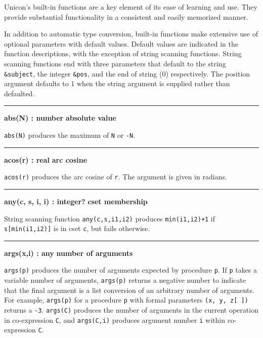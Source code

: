 Unicon's built-in functions
are a key element of its ease of learning and use. They provide
substantial functionality in a consistent and easily memorized manner.

In addition to automatic type conversion, built-in functions make
extensive use of optional parameters with default values. Default
values are indicated in the function descriptions, with the exception
of string scanning functions.
String scanning
functions end with three parameters that
default to the string \texttt{\&subject}, the integer \texttt{\&pos},
and the end of string (0) respectively. The position argument defaults
to 1 when the string argument is supplied rather than defaulted.

\bigskip
\hrule\vspace{0.1cm}
\noindent
{\bf abs(N) : number} \hfill {\bf absolute value}

\noindent
{}\texttt{abs(N)} produces the maximum of
\texttt{N} or \texttt{{}-N}.

\bigskip
\hrule\vspace{0.1cm}
\noindent
{\bf acos(r) : real} \hfill {\bf arc cosine}

\noindent
{}\texttt{acos(r)} produces the arc cosine of
\texttt{r}. The argument is given in radians.

\bigskip
\hrule\vspace{0.1cm}
\noindent
{\bf any(c, s, i, i) : integer? } \hfill {\bf cset membership}

\noindent
{}String scanning function
\texttt{any(c,s,i1,i2)} produces \texttt{min(i1,i2)+1} if \texttt{s[min(i1,i2)]}
is in cset \texttt{c}, but fails otherwise.

\bigskip
\hrule\vspace{0.1cm}
\noindent
{\bf args(x,i) : any } \hfill {\bf number of arguments}

\noindent
{}\texttt{args(p)} produces the number of arguments
expected by procedure \texttt{p}. If \texttt{p} takes a variable number
of arguments, \texttt{args(p)} returns a negative number to indicate
that the final argument is a list conversion of an arbitrary number of
arguments. For example, \texttt{args(p)} for a procedure \texttt{p}
with formal parameters \texttt{(x, y, z[ ])} returns a \texttt{{}-3}.
\texttt{args(C)} produces the number of arguments in the current
operation in co-expression \texttt{C}, and \texttt{args(C,i)} produces
argument number \texttt{i} within co-expression \texttt{C}.

